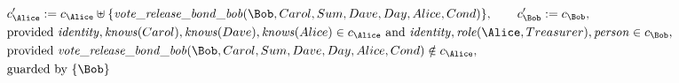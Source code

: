 \begin{align*}
&
c'_
{
\Alice
}
 := 
c_
{
\Alice
}
 \uplus 
\{
\mathit{\detokenize{
vote_release_bond_bob
}}
(
\Bob
,
Carol
,
Sum
,
Dave
,
Day
,
Alice
,
Cond
)
\}
, \qquad 
c'_
{
\Bob
}
 := 
c_
{
\Bob
}
,\\
&
\text{provided } 
\mathit{\detokenize{
identity
}}
,
\mathit{\detokenize{
knows
}}
(
Carol
)
,
\mathit{\detokenize{
knows
}}
(
Dave
)
,
\mathit{\detokenize{
knows
}}
(
Alice
)
 \in c_
{
\Alice
}
 \text{ and } 
\mathit{\detokenize{
identity
}}
,
\mathit{\detokenize{
role
}}
(
\Alice
,
Treasurer
)
,
\mathit{\detokenize{
person
}}
 \in c_
{
\Bob
}
,\\
&
\text{provided } 
\mathit{\detokenize{
vote_release_bond_bob
}}
(
\Bob
,
Carol
,
Sum
,
Dave
,
Day
,
Alice
,
Cond
)
 \notin c_
{
\Alice
}
,\\
&
\text{guarded by } \{
\Bob
\}
\end{align*}

